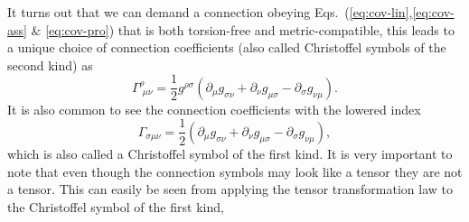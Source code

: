 It turns out that we can demand a connection obeying Eqs.~(\ref{eq:cov-lin},\ref{eq:cov-ass} $\&$ \ref{eq:cov-pro}) that is both torsion-free and metric-compatible, this leads to a unique choice of connection coefficients (also called Christoffel symbols of the second kind) as
\begin{equation}
\Gamma^\rho_{\,\,\mu\nu} = \frac{1}{2}g^{\rho\sigma} ( \partial_{\mu} g_{\sigma\nu} + \partial_{\nu} g_{\mu\sigma} - \partial_{\sigma} g_{\nu\mu} ).
\end{equation}
It is also common to see the connection coefficients with the lowered index
\begin{equation}
\Gamma_{\sigma\mu\nu} = \frac{1}{2}( \partial_{\mu} g_{\sigma\nu} + \partial_{\nu} g_{\mu\sigma} - \partial_{\sigma} g_{\nu\mu} ),
\end{equation}
which is also called a Christoffel symbol of the first kind. It is very important to note that even though the connection symbols may look like a tensor they are not a tensor. This can easily be seen from applying the tensor transformation law to the Christoffel symbol of the first kind,
